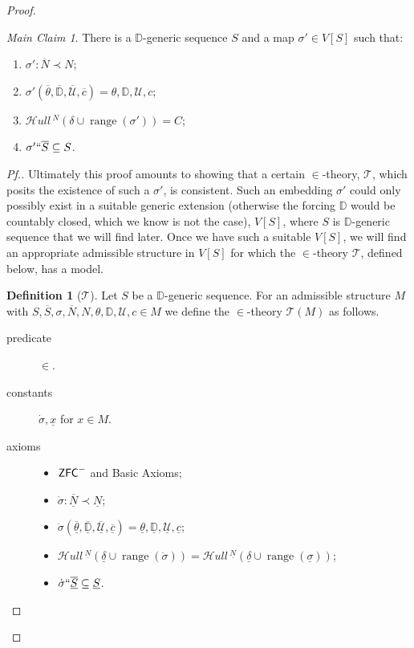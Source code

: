 \documentclass{amsart}
\theoremstyle{definition}
\newtheorem{definition}[theorem]{Definition}
\theoremstyle{remark}
\newtheorem*{claim}{Main Claim}
\newcommand{\D}{\mathbb{D}}
\newcommand{\N}{{\overline{N}}}
\renewcommand{\S}{{\overline{S}}}
\newcommand{\U}{\mathcal{U}}
\newcommand{\ZFC}{\textup{\ensuremath{\textsf{ZFC}}}}
\DeclareMathOperator{\ran}{range}
\newcommand{\SH}{\mathcal{H}\textit{ull} \,}
\newcommand{\sk}[3]{\SH^{#1}( {#2} \cup {\ran(#3)} ) }
\begin{document}
\begin{proof}
\begin{claim} There is a $\D$-generic sequence $S$ and a map $\sigma' \in V[S]$ such that: \begin{enumerate}
	\item \label{item:mainclaimsigma'elem} $\sigma': \N \prec N$;
	\item \label{item:mainclaim2} $\sigma'(\overline \theta, \overline{\D}, \overline{\U}, \overline c)=\theta, \D, \U, c$;
	\item \label{item:MainClaimC=Sk} $\sk{N}{\delta}{\sigma'} = C$;
	\item \label{item:mainclaimlifts} $\sigma' `` \S \subseteq S$.
\end{enumerate} \end{claim}
\begin{proof}[Pf.]  Ultimately this proof amounts to showing that a certain 
$\in$-theory, $\mathcal T$, which posits the existence of such a $\sigma'$, is consistent. Such an embedding $\sigma'$ could only possibly exist in a suitable generic extension (otherwise the forcing $\D$ would be countably closed, which we know is not the case), $V[S]$, where $S$ is $\D$-generic sequence that we will find later.
Once we have such a suitable $V[S]$, we will find an appropriate admissible structure in $V[S]$ for which the $\in$-theory $\mathcal T$, defined below, has a model.

\begin{definition}[$\mathcal T$] \label{definition:T} Let $S$ be a $\D$-generic sequence. For an admissible structure $M$ with $S, \overline S, \sigma, \N, N, \theta, \D, \U, c \in M$ we define the $\in$-theory $\mathcal T(M)$ as follows.
\begin{description}
	\item[predicate] $\in$.
	\item[constants] $\dot{\sigma}, \underline x$ for $x \in M$.
	\item[axioms] \begin{itemize} \item $\ZFC^-$ and \textsf{Basic Axioms};
		\item $\dot \sigma : \overline{\underline N} \prec \underline N$;
		\item $\dot{\sigma}(\overline{\underline{\theta}}, \overline{\underline{\D}}, \overline{\underline{\U}}, \overline{\underline c})=\underline{\theta}, \underline{\D}, \underline{\U}, \underline{c}$;
		\item $\sk{\underline N}{\underline{\delta}}{\dot \sigma} = \sk{\underline N}{\underline \delta}{\underline \sigma}$;
		\item $\dot \sigma ``\overline{\underline S} \subseteq \underline S$.
	\end{itemize}
\end{description}
\end{definition}


\end{proof}
\end{proof}
\end{document}

